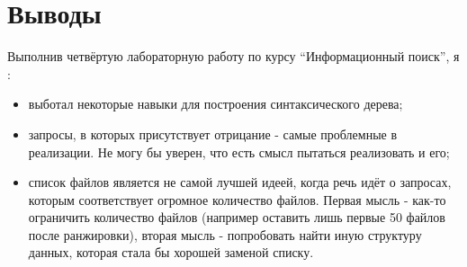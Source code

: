 \section{Выводы}

Выполнив четвёртую лабораторную работу по курсу \enquote{Информационный поиск}, я :
\begin{itemize}
    \item выботал некоторые навыки для построения синтаксического дерева;
    \item запросы, в которых присутствует отрицание - самые проблемные в реализации. Не могу бы уверен, что есть смысл пытаться реализовать и его;
    \item список файлов является не самой лучшей идеей, когда речь идёт о запросах, которым соответствует огромное количество файлов. Первая мысль - как-то ограничить количество файлов (например оставить лишь первые 50 файлов после ранжировки), вторая мысль - попробовать найти иную структуру данных, которая стала бы хорошей заменой списку.
\end{itemize}
\pagebreak
